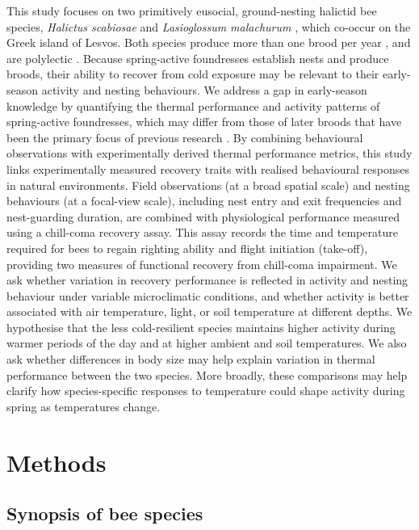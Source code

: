 \documentclass[11pt,a4paper]{article}
\begin{document}
This study focuses on two primitively eusocial, ground-nesting halictid bee species, \textit{Halictus scabiosae} and \textit{Lasioglossum malachurum} \citep{Plateaux2008, Michener2007}, which co-occur on the Greek island of Lesvos. Both species produce more than one brood per year \citep{Michener2007, Fawcett2019}, and are polylectic \citep{Shebl2012, Bogusch2020}. Because spring-active foundresses establish nests and produce broods, their ability to recover from cold exposure may be relevant to their early-season activity and nesting behaviours. We address a gap in early-season knowledge by quantifying the thermal performance and activity patterns of spring-active foundresses, which may differ from those of later broods that have been the primary focus of previous research \citep{Gonzalez2024}. By combining behavioural observations with experimentally derived thermal performance metrics, this study links experimentally measured recovery traits with realised behavioural responses in natural environments. Field observations (at a broad spatial scale) and nesting behaviours (at a focal-view scale), including nest entry and exit frequencies and nest-guarding duration, are combined with physiological performance measured using a chill-coma recovery assay. This assay records the time and temperature required for bees to regain righting ability and flight initiation (take-off), providing two measures of functional recovery from chill-coma impairment. We ask whether variation in recovery performance is reflected in activity and nesting behaviour under variable microclimatic conditions, and whether activity is better associated with air temperature, light, or soil temperature at different depths. We hypothesise that the less cold-resilient species maintains higher activity during warmer periods of the day and at higher ambient and soil temperatures. We also ask whether differences in body size may help explain variation in thermal performance between the two species. More broadly, these comparisons may help clarify how species-specific responses to temperature could shape activity during spring as temperatures change.

\section{Methods}

\subsection{Synopsis of bee species}
\end{document}
